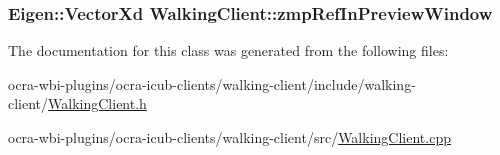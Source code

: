 \hypertarget{classWalkingClient_af28b3cd3b1202f83e193b098572fbdd3}{
\subsubsection[{zmp\-Ref\-In\-Preview\-Window}]{\setlength{\rightskip}{0pt plus 5cm}\-Eigen\-::\-Vector\-Xd {\bf \-Walking\-Client\-::zmp\-Ref\-In\-Preview\-Window}}}\label{classWalkingClient_af28b3cd3b1202f83e193b098572fbdd3}


\-The documentation for this class was generated from the following files\-:\begin{DoxyCompactItemize}
\item 
ocra-\/wbi-\/plugins/ocra-\/icub-\/clients/walking-\/client/include/walking-\/client/\hyperlink{WalkingClient_8h}{\-Walking\-Client.\-h}\item 
ocra-\/wbi-\/plugins/ocra-\/icub-\/clients/walking-\/client/src/\hyperlink{WalkingClient_8cpp}{\-Walking\-Client.\-cpp}\end{DoxyCompactItemize}
